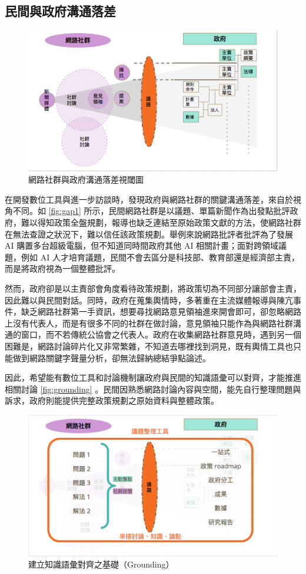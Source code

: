 \documentclass[12pt,a4paper]{article}
\begin{document}
\subsection{民間與政府溝通落差}
\label{sec:orgb92cfdf}
\begin{figure}[htbp]
\centering
\includegraphics[width=.9\linewidth]{./images/gap1.png}
\caption{\label{fig:org653ca1f}
網路社群與政府溝通落差視閾圖}
\end{figure}

在開發數位工具與進一步訪談時，發現政府與網路社群的關鍵溝通落差，來自於視角不同。如 \ref{fig:gap1} 所示，民間網路社群是以議題、單篇新聞作為出發點批評政府，難以得知政策全盤規劃，報導也缺乏連結至原始政策文獻的方法，使網路社群在無法查證之狀況下，難以信任該政策規劃。舉例來說網路批評者批評為了發展 AI 購置多台超級電腦，但不知道同時間政府其他 AI 相關計畫；面對跨領域議題，例如 AI 人才培育議題，民間不會去區分是科技部、教育部還是經濟部主責，而是將政府視為一個整體批評。

然而，政府卻是以主責部會角度看待政策規劃，將政策切為不同部分讓部會主責，因此難以與民間對話。同時，政府在蒐集輿情時，多著重在主流媒體報導與陳亢事件，缺乏網路社群第一手資訊，想要尋找網路意見領袖進來開會即可，卻忽略網路上沒有代表人，而是有很多不同的社群在做討論，意見領袖只能作為與網路社群溝通的窗口，而不若傳統公協會之代表人。政府在收集網路社群意見時，遇到另一個困難是，網路討論碎片化又非常繁雜，不知道去哪裡找到洞見，既有輿情工具也只能做到網路關鍵字聲量分析，卻無法歸納總結爭點論述。

因此，希望能有數位工具和討論機制讓政府與民間的知識語彙可以對齊，才能推進相關討論 \ref{fig:grounding} 。民間因熟悉網路討論內容與空間，能先自行整理問題與訴求，政府則能提供完整政策規劃之原始資料與整體政策。

\begin{figure}[htbp]
\centering
\includegraphics[width=.9\linewidth]{./images/gap2.png}
\caption{\label{fig:org771d11e}
建立知識語彙對齊之基礎（Grounding）}
\end{figure}
\end{document}
